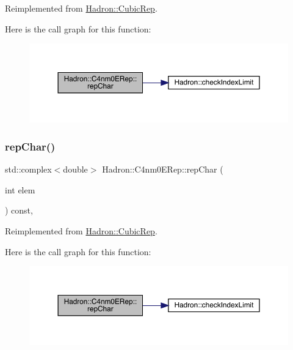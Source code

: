 Reimplemented from \mbox{\hyperlink{structHadron_1_1CubicRep_af45227106e8e715e84b0af69cd3b36f8}{Hadron\+::\+Cubic\+Rep}}.

Here is the call graph for this function\+:
\nopagebreak
\begin{figure}[H]
\begin{center}
\leavevmode
\includegraphics[width=350pt]{d3/d8a/structHadron_1_1C4nm0ERep_ae2587ec63f886eaafedfaede40ebdba5_cgraph}
\end{center}
\end{figure}
\mbox{\label{structHadron_1_1C4nm0ERep_ae2587ec63f886eaafedfaede40ebdba5}} 
\subsubsection{\texorpdfstring{repChar()}{repChar()}\hspace{0.1cm}{\footnotesize\ttfamily [3/3]}}
{\footnotesize\ttfamily std\+::complex$<$double$>$ Hadron\+::\+C4nm0\+E\+Rep\+::rep\+Char (\begin{DoxyParamCaption}\item[{int}]{elem }\end{DoxyParamCaption}) const\hspace{0.3cm}{\ttfamily [inline]}, {\ttfamily [virtual]}}



Reimplemented from \mbox{\hyperlink{structHadron_1_1CubicRep_af45227106e8e715e84b0af69cd3b36f8}{Hadron\+::\+Cubic\+Rep}}.

Here is the call graph for this function\+:
\nopagebreak
\begin{figure}[H]
\begin{center}
\leavevmode
\includegraphics[width=350pt]{d3/d8a/structHadron_1_1C4nm0ERep_ae2587ec63f886eaafedfaede40ebdba5_cgraph}
\end{center}
\end{figure}
\mbox{\label{structHadron_1_1C4nm0ERep_aa9353c0f2a226224911c51db6f647ccf}} 
